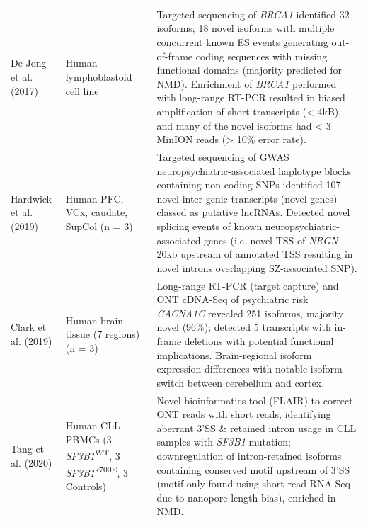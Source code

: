 \begin{landscape}
\begin{longtable}[c]{p{4cm}p{4cm}p{18cm}}
		\centering De Jong et al. (2017)\cite{DeJong2017}  &
		\centering Human lymphoblastoid cell line &
		\tabitem Targeted sequencing of \textit{BRCA1} identified 32 isoforms; 18 novel isoforms with multiple concurrent known ES events generating out-of-frame coding sequences with missing functional domains (majority predicted for NMD). \newline
		\tabitem Enrichment of \textit{BRCA1} performed with long-range RT-PCR resulted in biased amplification of short transcripts (< 4kB), and many of the novel isoforms had < 3 MinION reads (> 10\% error rate).  \\
		\hdashline[0.5pt/5pt]
		
		\centering Hardwick et al. (2019) \cite{Hardwick2019a} &
		\centering Human PFC, VCx, \newline caudate, SupCol (n = 3)  &
		\tabitem Targeted sequencing of GWAS neuropsychiatric-associated haplotype blocks containing non-coding SNPs identified 107 novel inter-genic transcripts (novel genes) classed as putative lncRNAs. \newline 
		\tabitem Detected novel splicing events of known neuropsychiatric-associated genes (i.e. novel TSS of \textit{NRGN} 20kb upstream of annotated TSS resulting in novel introns overlapping SZ-associated SNP).  \\
		
		\centering Clark et al. (2019) \cite{Clark2019} &
		\centering Human brain tissue \newline (7 regions) (n = 3) &
		\tabitem Long-range RT-PCR (target capture) and ONT cDNA-Seq of psychiatric risk \textit{CACNA1C} revealed 251 isoforms, majority novel (96\%); detected 5 transcripts with in-frame deletions with potential functional implications.  \newline 
		\tabitem Brain-regional isoform expression differences with notable isoform switch between cerebellum and cortex.  \\
		\hdashline[0.5pt/5pt]
		
		\centering Tang et al. (2020) \cite{Tang2020} &
		\centering Human CLL PBMCs \newline (3 \textit{SF3B1}\textsuperscript{WT}, 3 \textit{SF3B1}\textsuperscript{k700E}, 3 Controls) &
		\tabitem Novel bioinformatics tool (FLAIR) to correct ONT reads with short reads, identifying aberrant 3'SS \& retained intron usage in CLL samples with \textit{SF3B1} mutation; downregulation of intron-retained isoforms containing conserved motif upstream of 3'SS (motif only found using short-read RNA-Seq due to nanopore length bias), enriched in NMD.  \\
		

\end{longtable}
\end{landscape}

